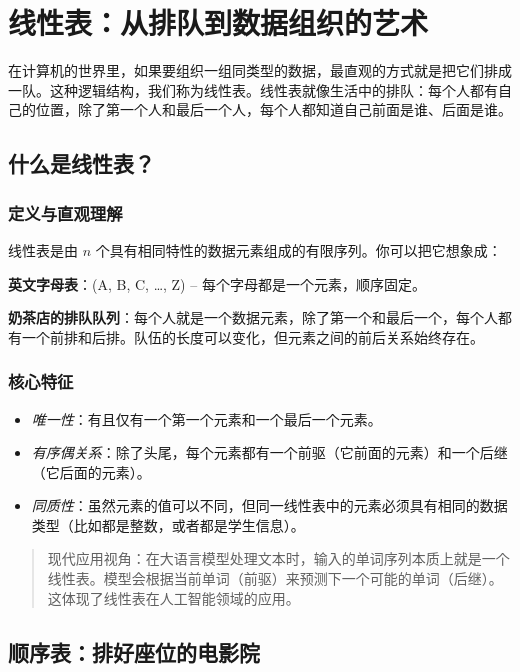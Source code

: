 \chapter{线性表：从排队到数据组织的艺术}

在计算机的世界里，如果要组织一组同类型的数据，最直观的方式就是把它们排成一队。这种逻辑结构，我们称为线性表。线性表就像生活中的排队：每个人都有自己的位置，除了第一个人和最后一个人，每个人都知道自己前面是谁、后面是谁。

\section{什么是线性表？}

\subsection{定义与直观理解}

线性表是由 \(n\) 个具有相同特性的数据元素组成的有限序列。你可以把它想象成：

\textbf{英文字母表}：(A, B, C, …, Z) – 每个字母都是一个元素，顺序固定。

\textbf{奶茶店的排队队列}：每个人就是一个数据元素，除了第一个和最后一个，每个人都有一个前排和后排。队伍的长度可以变化，但元素之间的前后关系始终存在。

\subsection{核心特征}

\begin{itemize}
    \item \emph{唯一性}：有且仅有一个第一个元素和一个最后一个元素。
    \item \emph{有序偶关系}：除了头尾，每个元素都有一个前驱（它前面的元素）和一个后继（它后面的元素）。
    \item \emph{同质性}：虽然元素的值可以不同，但同一线性表中的元素必须具有相同的数据类型（比如都是整数，或者都是学生信息）。
\end{itemize}

\begin{quote}
现代应用视角：在大语言模型处理文本时，输入的单词序列本质上就是一个线性表。模型会根据当前单词（前驱）来预测下一个可能的单词（后继）。这体现了线性表在人工智能领域的应用。
\end{quote}

\section{顺序表：排好座位的电影院}

